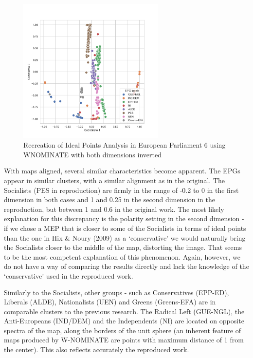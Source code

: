 \documentclass[a4paper,12pt]{report}
\begin{document}
                \begin{figure}[H]
                    \centering
                    \includegraphics[width=0.65\textwidth]{Graphs/WNOMINATEflipped2d}
                    \caption
                    {Recreation of Ideal Points Analysis in European Parliament 6 using WNOMINATE with both dimensions
                    inverted}
                    \label{fig:WNOMINATE 6 FLIPPED}
                \end{figure}
                With maps aligned, several similar characteristics become apparent. The EPGs appear in similar
                clusters, with a similar alignment as in the original. The Socialists (PES in reproduction) are
                firmly in the range of
                -0.2 to 0 in the first dimension in both cases and 1 and 0.25 in the second dimension in the
                reproduction, but between 1 and 0.6 in the original work. The most likely explanation for this
                discrepancy is the polarity setting in the second dimension - if we chose a MEP that is closer to
                some of the
                Socialists in terms of ideal points than the one in Hix \& Noury (2009) as a `conservative' we would
                naturally
                bring the Socialists closer to the middle of the map, distorting the image. That seems to be the
                most competent explanation of this phenomenon. Again, however, we do not have a way of comparing the
                results directly and lack the knowledge of the `conservative' used in the reproduced work.

                Similarly to the Socialists, other groups - such as Conservatives (EPP-ED), Liberals (ALDE),
                Nationalists (UEN) and Greens (Greens-EFA) are in comparable clusters to the previous research. The
                Radical Left (GUE-NGL), the Anti-Europeans (IND/DEM) and the Independents (NI) are located on
                opposite spectra of the map, along the borders of the unit sphere (an inherent feature of maps
                produced by W-NOMINATE are points with maximum distance of 1 from the center). This also reflects
                accurately the reproduced work.
\end{document}
